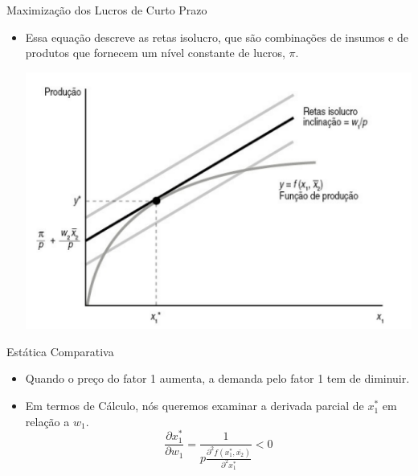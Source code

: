 \documentclass[aspectratio=169]{beamer}
\begin{document}
\begin{frame}{Maximização dos Lucros de Curto Prazo}

\begin{block}{ }

\begin{itemize}
    \item Essa equação descreve as retas isolucro, que são combinações de insumos e de produtos que fornecem um nível constante de lucros, $\pi$. 

    
     \centering \includegraphics[scale = 0.5]{grafico1}
    
  
\end{itemize}

\end{block}
\end{frame}

\begin{frame}{Estática Comparativa}

\begin{block}{ }

\begin{itemize}
    \item Quando o preço do fator 1 aumenta, a demanda pelo fator 1 tem de diminuir.
    \item Em termos de Cálculo, nós queremos examinar a derivada parcial de $x^*_1$ em relação a $w_1$. $$ \frac{\partial x_1^*}{\partial w_1} = \frac{1}{p \frac{\partial^2 f(x_1^* , \bar{x_2})}{\partial^2 x_1^*}} < 0$$
    
    
  
\end{itemize}

\end{block}
\end{frame}
\end{document}
